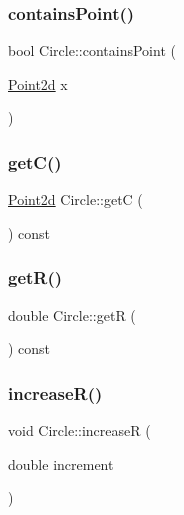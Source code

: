 \subsubsection{\texorpdfstring{contains\+Point()}{containsPoint()}}
{\footnotesize\ttfamily bool Circle\+::contains\+Point (\begin{DoxyParamCaption}\item[{\hyperlink{class_point2d}{Point2d}}]{x }\end{DoxyParamCaption})}

\mbox{\label{class_circle_a3c261e77ada27aa079cc3b2a1b0101c8}} 
\subsubsection{\texorpdfstring{get\+C()}{getC()}}
{\footnotesize\ttfamily \hyperlink{class_point2d}{Point2d} Circle\+::getC (\begin{DoxyParamCaption}{ }\end{DoxyParamCaption}) const}

\mbox{\label{class_circle_a9a44a938e3d8df0b6ecb6f3f00a0878d}} 
\subsubsection{\texorpdfstring{get\+R()}{getR()}}
{\footnotesize\ttfamily double Circle\+::getR (\begin{DoxyParamCaption}{ }\end{DoxyParamCaption}) const}

\mbox{\label{class_circle_a74d675a63d50d899cfeda335ce13d161}} 
\subsubsection{\texorpdfstring{increase\+R()}{increaseR()}}
{\footnotesize\ttfamily void Circle\+::increaseR (\begin{DoxyParamCaption}\item[{double}]{increment }\end{DoxyParamCaption})}

\mbox{\label{class_circle_aef8608916a5c51ec2de281eccb5276dc}} 
